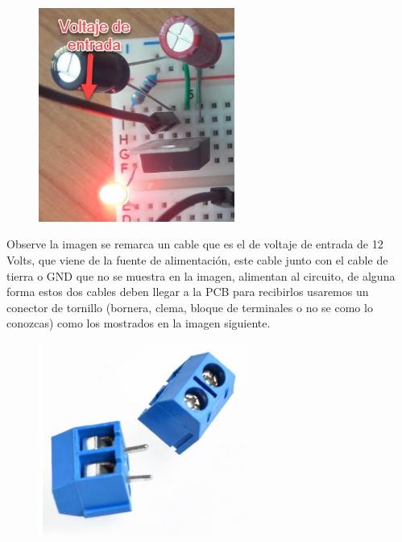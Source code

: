 \documentclass[12pt]{article}
\begin{document}

\begin{figure}[H]
	\begin{Center}
		\includegraphics[width=2.54in,height=2.78in]{./media/image14.jpeg}
	\end{Center}
\end{figure}



\par

Observe la imagen se remarca un cable que es el de voltaje de entrada de 12 Volts, que viene de la fuente de alimentación, este cable junto con el cable de tierra o GND que no se muestra en la imagen, alimentan al circuito, de alguna forma estos dos cables deben llegar a la PCB para recibirlos usaremos un conector de tornillo (bornera, clema, bloque de terminales o no se como lo conozcas) como los mostrados en la imagen siguiente.\par




\begin{figure}[H]
	\begin{Center}
		\includegraphics[width=2.7in,height=2.49in]{./media/image15.jpeg}
	\end{Center}
\end{figure}
\end{document}

